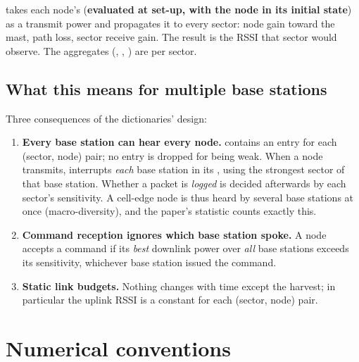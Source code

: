  takes each node's  (\textbf{evaluated at set-up, with the node in its initial state}) as a transmit power and propagates it to every sector: node gain toward the mast, path loss, sector receive gain. The result  is the RSSI that sector would observe. The aggregates (, , ) are per sector.

\subsection{What this means for multiple base stations}

Three consequences of the dictionaries' design:
\begin{enumerate}
 \item \textbf{Every base station can hear every node.}  contains an entry for each (sector, node) pair; no entry is dropped for being weak. When a node transmits,  interrupts \emph{each} base station in its , using the strongest sector of that base station. Whether a packet is \emph{logged} is decided afterwards by each sector's sensitivity. A cell-edge node is thus heard by several base stations at once (macro-diversity), and the paper's  statistic counts exactly this.
 \item \textbf{Command reception ignores which base station spoke.} A node accepts a command if its \emph{best} downlink power over \emph{all} base stations exceeds its sensitivity, whichever base station issued the command.
 \item \textbf{Static link budgets.} Nothing changes with time except the harvest; in particular the uplink RSSI is a constant for each (sector, node) pair.
\end{enumerate}

\section{Numerical conventions}
\label{sec:numconv}

